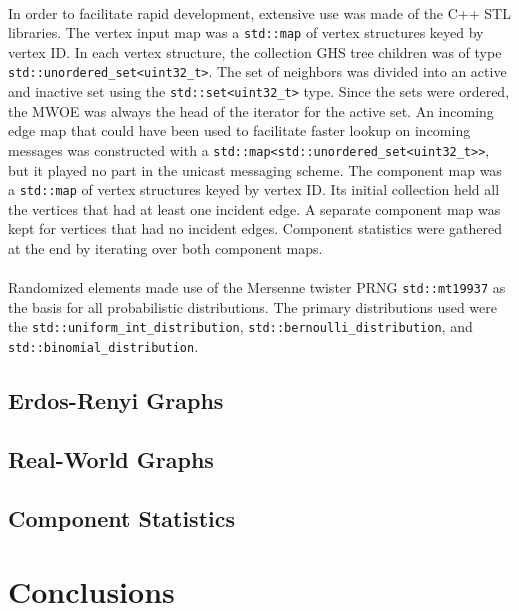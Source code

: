 \documentclass[11pt,epsf]{article}
\begin{document}
{{    \paragraph{}{
      In order to facilitate rapid development, extensive use was made of the C++ STL
      libraries. The vertex input map was a \texttt{std::map}\autocite{map}
      of vertex structures keyed by vertex ID. In each vertex structure, the collection
      GHS tree children was of type \texttt{std::unordered\_set<uint32\_t>}\autocite{unorderedset}.
      The set of neighbors was divided into an active and inactive set using the
      \texttt{std::set<uint32\_t>}\autocite{set} type. Since the sets were ordered,
      the MWOE was always the head of the iterator for the active set.
      An incoming edge map that could have been used to facilitate faster lookup on incoming messages
      was constructed with a \texttt{std::map<std::unordered\_set<uint32\_t>>}, but it played no
      part in the unicast messaging scheme. The component map was a \texttt{std::map}\autocite{map}
      of vertex structures keyed by vertex ID. Its initial collection held all the
      vertices that had at least one incident edge. A separate component map was kept
      for vertices that had no incident edges. Component statistics were gathered at the
      end by iterating over both component maps.
    }
    \paragraph{}{
      Randomized elements\autocite{random} made use of the Mersenne twister PRNG \texttt{std::mt19937}\autocite{mt19337}
      as the basis for all probabilistic distributions. The primary distributions used were
      the \texttt{std::uniform\_int\_distribution}\autocite{uniformintdist},
      \texttt{std::bernoulli\_distribution}\autocite{bernoullidist}, and
      \texttt{std::binomial\_distribution}\autocite{binomialdist}.
    }
  }

  \subsection{Erdos-Renyi Graphs}{
  }
  \subsection{Real-World Graphs}{
  }
  \subsection{Component Statistics}{
  }
}

\section{Conclusions}{
}

\printbibliography
\end{document}
